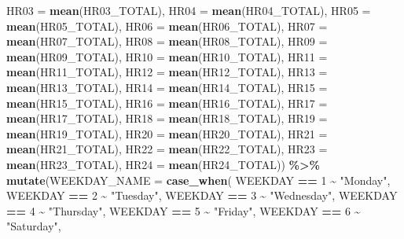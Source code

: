 \documentclass[
  12pt,
]{article}
\newenvironment{Shaded}{\begin{snugshade}}{\end{snugshade}}
\newcommand{\AttributeTok}[1]{\textcolor[rgb]{0.13,0.29,0.53}{#1}}
\newcommand{\DecValTok}[1]{\textcolor[rgb]{0.00,0.00,0.81}{#1}}
\newcommand{\FunctionTok}[1]{\textcolor[rgb]{0.13,0.29,0.53}{\textbf{#1}}}
\newcommand{\NormalTok}[1]{#1}
\newcommand{\SpecialCharTok}[1]{\textcolor[rgb]{0.81,0.36,0.00}{\textbf{#1}}}
\newcommand{\StringTok}[1]{\textcolor[rgb]{0.31,0.60,0.02}{#1}}
\begin{document}
\begin{Shaded}
\begin{Highlighting}[]
            \AttributeTok{HR03 =} \FunctionTok{mean}\NormalTok{(HR03\_TOTAL),}
            \AttributeTok{HR04 =} \FunctionTok{mean}\NormalTok{(HR04\_TOTAL),}
            \AttributeTok{HR05 =} \FunctionTok{mean}\NormalTok{(HR05\_TOTAL),}
            \AttributeTok{HR06 =} \FunctionTok{mean}\NormalTok{(HR06\_TOTAL),}
            \AttributeTok{HR07 =} \FunctionTok{mean}\NormalTok{(HR07\_TOTAL),}
            \AttributeTok{HR08 =} \FunctionTok{mean}\NormalTok{(HR08\_TOTAL),}
            \AttributeTok{HR09 =} \FunctionTok{mean}\NormalTok{(HR09\_TOTAL),}
            \AttributeTok{HR10 =} \FunctionTok{mean}\NormalTok{(HR10\_TOTAL),}
            \AttributeTok{HR11 =} \FunctionTok{mean}\NormalTok{(HR11\_TOTAL),}
            \AttributeTok{HR12 =} \FunctionTok{mean}\NormalTok{(HR12\_TOTAL),}
            \AttributeTok{HR13 =} \FunctionTok{mean}\NormalTok{(HR13\_TOTAL),}
            \AttributeTok{HR14 =} \FunctionTok{mean}\NormalTok{(HR14\_TOTAL),}
            \AttributeTok{HR15 =} \FunctionTok{mean}\NormalTok{(HR15\_TOTAL),}
            \AttributeTok{HR16 =} \FunctionTok{mean}\NormalTok{(HR16\_TOTAL),}
            \AttributeTok{HR17 =} \FunctionTok{mean}\NormalTok{(HR17\_TOTAL),}
            \AttributeTok{HR18 =} \FunctionTok{mean}\NormalTok{(HR18\_TOTAL),}
            \AttributeTok{HR19 =} \FunctionTok{mean}\NormalTok{(HR19\_TOTAL),}
            \AttributeTok{HR20 =} \FunctionTok{mean}\NormalTok{(HR20\_TOTAL),}
            \AttributeTok{HR21 =} \FunctionTok{mean}\NormalTok{(HR21\_TOTAL),}
            \AttributeTok{HR22 =} \FunctionTok{mean}\NormalTok{(HR22\_TOTAL),}
            \AttributeTok{HR23 =} \FunctionTok{mean}\NormalTok{(HR23\_TOTAL),}
            \AttributeTok{HR24 =} \FunctionTok{mean}\NormalTok{(HR24\_TOTAL)) }\SpecialCharTok{\%\textgreater{}\%}
  \FunctionTok{mutate}\NormalTok{(}\AttributeTok{WEEKDAY\_NAME =} \FunctionTok{case\_when}\NormalTok{(}
\NormalTok{    WEEKDAY }\SpecialCharTok{==} \DecValTok{1} \SpecialCharTok{\textasciitilde{}} \StringTok{"Monday"}\NormalTok{,}
\NormalTok{    WEEKDAY }\SpecialCharTok{==} \DecValTok{2} \SpecialCharTok{\textasciitilde{}} \StringTok{"Tuesday"}\NormalTok{,}
\NormalTok{    WEEKDAY }\SpecialCharTok{==} \DecValTok{3} \SpecialCharTok{\textasciitilde{}} \StringTok{"Wednesday"}\NormalTok{,}
\NormalTok{    WEEKDAY }\SpecialCharTok{==} \DecValTok{4} \SpecialCharTok{\textasciitilde{}} \StringTok{"Thursday"}\NormalTok{,}
\NormalTok{    WEEKDAY }\SpecialCharTok{==} \DecValTok{5} \SpecialCharTok{\textasciitilde{}} \StringTok{"Friday"}\NormalTok{,}
\NormalTok{    WEEKDAY }\SpecialCharTok{==} \DecValTok{6} \SpecialCharTok{\textasciitilde{}} \StringTok{"Saturday"}\NormalTok{,}

\end{Highlighting}
\end{Shaded}
\end{document}
